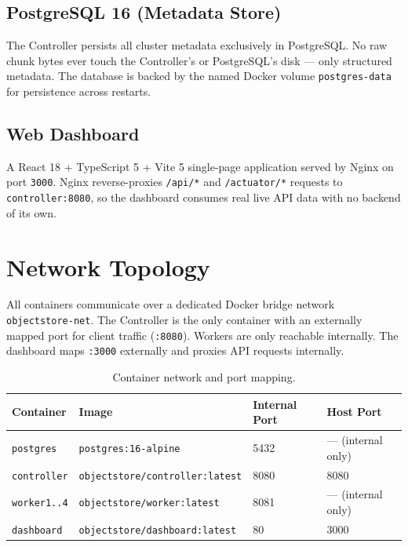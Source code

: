 \documentclass[12pt,a4paper]{report}
\begin{document}
\subsection{PostgreSQL 16 (Metadata Store)}

The Controller persists all cluster metadata exclusively in PostgreSQL. No raw chunk bytes ever touch the Controller's or PostgreSQL's disk --- only structured metadata. The database is backed by the named Docker volume \texttt{postgres-data} for persistence across restarts.

\subsection{Web Dashboard}

A React 18 + TypeScript 5 + Vite 5 single-page application served by Nginx on port \texttt{3000}. Nginx reverse-proxies \texttt{/api/*} and \texttt{/actuator/*} requests to \texttt{controller:8080}, so the dashboard consumes real live API data with no backend of its own.

\section{Network Topology}

All containers communicate over a dedicated Docker bridge network \texttt{objectstore-net}. The Controller is the only container with an externally mapped port for client traffic (\texttt{:8080}). Workers are only reachable internally. The dashboard maps \texttt{:3000} externally and proxies API requests internally.

\begin{table}[H]
  \centering
  \caption{Container network and port mapping.}
  \label{tab:network}
  \begin{tabular}{llll}
    \toprule
    \textbf{Container} & \textbf{Image} & \textbf{Internal Port} & \textbf{Host Port} \\
    \midrule
    \texttt{postgres}    & \texttt{postgres:16-alpine}            & 5432 & --- (internal only) \\
    \texttt{controller}  & \texttt{objectstore/controller:latest} & 8080 & 8080 \\
    \texttt{worker1..4}  & \texttt{objectstore/worker:latest}     & 8081 & --- (internal only) \\
    \texttt{dashboard}   & \texttt{objectstore/dashboard:latest}  & 80   & 3000 \\
    \bottomrule
  \end{tabular}
\end{table}
\end{document}
